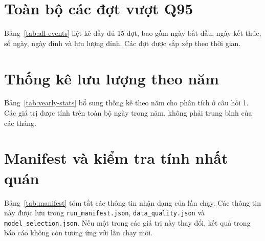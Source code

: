 \clearpage
\appendix

\section{Toàn bộ các đợt vượt Q95}
\label{app:events}

Bảng~\ref{tab:all-events} liệt kê đầy đủ 15 đợt, bao gồm ngày bắt đầu, ngày kết
thúc, số ngày, ngày đỉnh và lưu lượng đỉnh. Các đợt được sắp xếp theo thời gian.

\begin{table}[H]
\centering
\footnotesize
\setlength{\tabcolsep}{3.2pt}

\caption{Toàn bộ các đợt lưu lượng vượt Q95 trong giai đoạn 2010--2023.}
\label{tab:all-events}
\end{table}

\section{Thống kê lưu lượng theo năm}
\label{app:yearly}

Bảng~\ref{tab:yearly-stats} bổ sung thống kê theo năm cho phân tích ở câu hỏi 1.
Các giá trị được tính trên toàn bộ ngày trong năm, không phải trung bình của các
tháng.

\begin{table}[H]
\centering
\footnotesize
\setlength{\tabcolsep}{3.2pt}

\caption{Thống kê lưu lượng theo năm, 2010--2023.}
\label{tab:yearly-stats}
\end{table}

\section{Manifest và kiểm tra tính nhất quán}
\label{app:manifest}

Bảng~\ref{tab:manifest} tóm tắt các thông tin nhận dạng của lần chạy. Các thông tin
này được lưu trong \texttt{run\_manifest.json}, \texttt{data\_quality.json} và
\texttt{model\_selection.json}. Nếu một trong các giá trị này thay đổi, kết quả
trong báo cáo không còn tương ứng với lần chạy mới.

